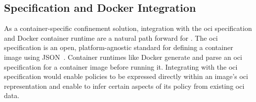 
\subsection{ Specification and Docker Integration}%
\label{ss:disc-docker-integration}

As a container-specific confinement solution, integration with the \gls{oci} specification
and Docker container runtime are a natural path forward for \bpfcontain{}. The \gls{oci}
specification is an open, platform-agnostic standard for defining a container image using
JSON~\cite{oci}. Container runtimes like Docker generate and parse an \gls{oci}
specification for a container image before running it. Integrating \bpfcontain{} with the
\gls{oci} specification would enable \bpfcontain{} policies to be expressed directly
within an image's \gls{oci} representation and enable \bpfcontain{} to infer certain
aspects of its policy from existing \gls{oci} data.

